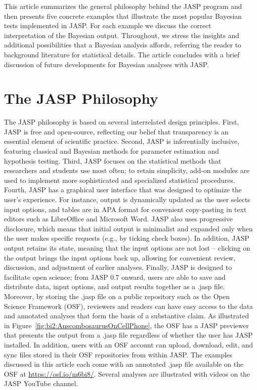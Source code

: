 This article summarizes the general philosophy behind the JASP program and then presents five concrete examples that illustrate the most popular Bayesian tests implemented in JASP. For each example we discuss the correct interpretation of the Bayesian output. Throughout, we stress the insights and additional possibilities that a Bayesian analysis affords, referring the reader to background literature for statistical details. The article concludes with a brief discussion of future developments for Bayesian analyses with JASP.

\section{The JASP Philosophy}
The JASP philosophy is based on several interrelated design principles. First, JASP is free and open-source, reflecting our belief that transparency is an essential element of scientific practice. Second, JASP is inferentially inclusive, featuring classical and Bayesian methods for parameter estimation and hypothesis testing. Third, JASP focuses on the statistical methods that researchers and students use most often; to retain simplicity, add-on modules are used to implement more sophisticated and specialized statistical procedures. Fourth, JASP has a graphical user interface that was designed to optimize the user's experience. For instance, output is dynamically updated as the user selects input options, and tables are in APA format for convenient copy-pasting in text editors such as LibreOffice and Microsoft Word. JASP also uses progressive disclosure, which means that initial output is minimalist and expanded only when the user makes specific requests (e.g., by ticking check boxes). In addition, JASP output retains its state, meaning that the input options are not lost -- clicking on the output brings the input options back up, allowing for convenient review, discussion, and adjustment of earlier analyses. Finally, JASP is designed to facilitate open science; from JASP $0.7$ onward, users are able to save and distribute data, input options, and output results together as a .jasp file. Moreover, by storing the .jasp file on a public repository such as the Open Science Framework (OSF), reviewers and readers can have easy access to the data and annotated analyses that form the basis of a substantive claim. As illustrated in Figure~\ref{fig:bi2:AnscombosaurusOnCellPhone}, the OSF has a JASP previewer that presents the output from a .jasp file regardless of whether the user has JASP installed. In addition, users with an OSF account can upload, download, edit, and sync files stored in their OSF repositories from within JASP. The examples discussed in this article each come with an annotated .jasp file available on the OSF at \url{https://osf.io/m6bi8/}. Several analyses are illustrated with videos on the JASP YouTube channel.

